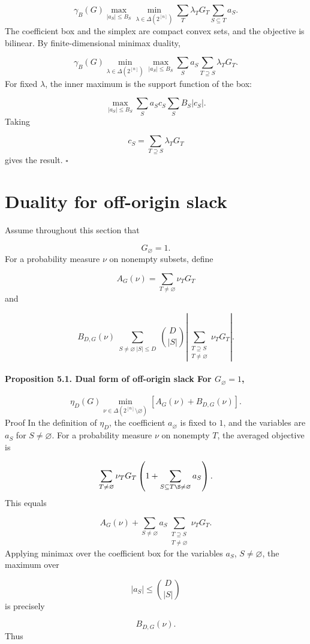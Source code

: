 \documentclass[11pt]{article}
\theoremstyle{definition}
\begin{document}
\[
\gamma_B(G)
\max_{|a_S|\le B_S}
\min_{\lambda\in\Delta(2^{[n]})}
\sum_T\lambda_TG_T\sum_{S\subseteq T}a_S.
\]
The coefficient box and the simplex are compact convex sets, and the objective is bilinear. By finite-dimensional minimax duality,

\[
\gamma_B(G)
\min_{\lambda\in\Delta(2^{[n]})}
\max_{|a_S|\le B_S}
\sum_Sa_S
\sum_{T\supseteq S}\lambda_TG_T.
\]
For fixed $\lambda$, the inner maximum is the support function of the box:

\[
\max_{|a_S|\le B_S}\sum_Sa_Sc_S
\sum_SB_S|c_S|.
\]
Taking

\[
c_S=\sum_{T\supseteq S}\lambda_TG_T
\]
gives the result. $\square$

\section{Duality for off-origin slack}
Assume throughout this section that

\[
G_\varnothing=1.
\]
For a probability measure $\nu$ on nonempty subsets, define

\[
A_G(\nu)=
\sum_{T\ne\varnothing}\nu_TG_T
\]
and

\[
B_{D,G}(\nu)
\sum_{\substack{S\ne\varnothing\ |S|\le D}}
\binom{D}{|S|}
\left|
\sum_{\substack{T\supseteq S\\ T\ne\varnothing}}\nu_TG_T
\right|.
\]
\paragraph{Proposition 5.1. Dual form of off-origin slack For $G_\varnothing=1$,}
\[
\eta_D(G)
\min_{\nu\in\Delta(2^{[n]}\setminus{\varnothing})}
\left[
A_G(\nu)+B_{D,G}(\nu)
\right].
\]
Proof In the definition of $\eta_D$, the coefficient $a_\varnothing$ is fixed to $1$, and the variables are $a_S$ for $S\ne\varnothing$. For a probability measure $\nu$ on nonempty $T$, the averaged objective is

\[
\sum_{T\ne\varnothing}\nu_TG_T
\left(
1+
\sum_{\substack{S\subseteq T\S\ne\varnothing}}a_S
\right).
\]
This equals

\[
A_G(\nu)
+
\sum_{S\ne\varnothing}a_S
\sum_{\substack{T\supseteq S\\ T\ne\varnothing}}\nu_TG_T.
\]
Applying minimax over the coefficient box for the variables $a_S$, $S\ne\varnothing$, the maximum over

\[
|a_S|\le \binom{D}{|S|}
\]
is precisely

\[
B_{D,G}(\nu).
\]
Thus
\end{document}

